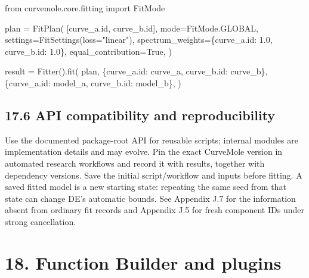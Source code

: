 \documentclass[
  10pt,
  a4paper,
  oneside]{scrreprt}
\newenvironment{Shaded}{}{}
\newcommand{\BuiltInTok}[1]{#1}
\newcommand{\FloatTok}[1]{\textcolor[rgb]{0.25,0.63,0.44}{#1}}
\newcommand{\ImportTok}[1]{#1}
\newcommand{\NormalTok}[1]{#1}
\newcommand{\OperatorTok}[1]{\textcolor[rgb]{0.40,0.40,0.40}{#1}}
\newcommand{\StringTok}[1]{\textcolor[rgb]{0.25,0.44,0.63}{#1}}
\newcommand{\VariableTok}[1]{\textcolor[rgb]{0.10,0.09,0.49}{#1}}
\begin{document}
\begin{Shaded}
\begin{Highlighting}[]
\ImportTok{from}\NormalTok{ curvemole.core.fitting }\ImportTok{import}\NormalTok{ FitMode}

\NormalTok{plan }\OperatorTok{=}\NormalTok{ FitPlan(}
\NormalTok{    [curve\_a.}\BuiltInTok{id}\NormalTok{, curve\_b.}\BuiltInTok{id}\NormalTok{],}
\NormalTok{    mode}\OperatorTok{=}\NormalTok{FitMode.GLOBAL,}
\NormalTok{    settings}\OperatorTok{=}\NormalTok{FitSettings(loss}\OperatorTok{=}\StringTok{"linear"}\NormalTok{),}
\NormalTok{    spectrum\_weights}\OperatorTok{=}\NormalTok{\{curve\_a.}\BuiltInTok{id}\NormalTok{: }\FloatTok{1.0}\NormalTok{, curve\_b.}\BuiltInTok{id}\NormalTok{: }\FloatTok{1.0}\NormalTok{\},}
\NormalTok{    equal\_contribution}\OperatorTok{=}\VariableTok{True}\NormalTok{,}
\NormalTok{)}

\NormalTok{result }\OperatorTok{=}\NormalTok{ Fitter().fit(}
\NormalTok{    plan,}
\NormalTok{    \{curve\_a.}\BuiltInTok{id}\NormalTok{: curve\_a, curve\_b.}\BuiltInTok{id}\NormalTok{: curve\_b\},}
\NormalTok{    \{curve\_a.}\BuiltInTok{id}\NormalTok{: model\_a, curve\_b.}\BuiltInTok{id}\NormalTok{: model\_b\},}
\NormalTok{)}
\end{Highlighting}
\end{Shaded}

\hypertarget{api-compatibility-and-reproducibility}{%
\section{17.6 API compatibility and
reproducibility}\label{api-compatibility-and-reproducibility}}

Use the documented package-root API for reusable scripts; internal
modules are implementation details and may evolve. Pin the exact
CurveMole version in automated research workflows and record it with
results, together with dependency versions. Save the initial
script/workflow and inputs before fitting. A saved fitted model is a new
starting state: repeating the same seed from that state can change DE's
automatic bounds. See Appendix J.7 for the information absent from
ordinary fit records and Appendix J.5 for fresh component IDs under
strong cancellation.

\hypertarget{function-builder-and-plugins}{%
\chapter{18. Function Builder and
plugins}\label{function-builder-and-plugins}}
\end{document}
